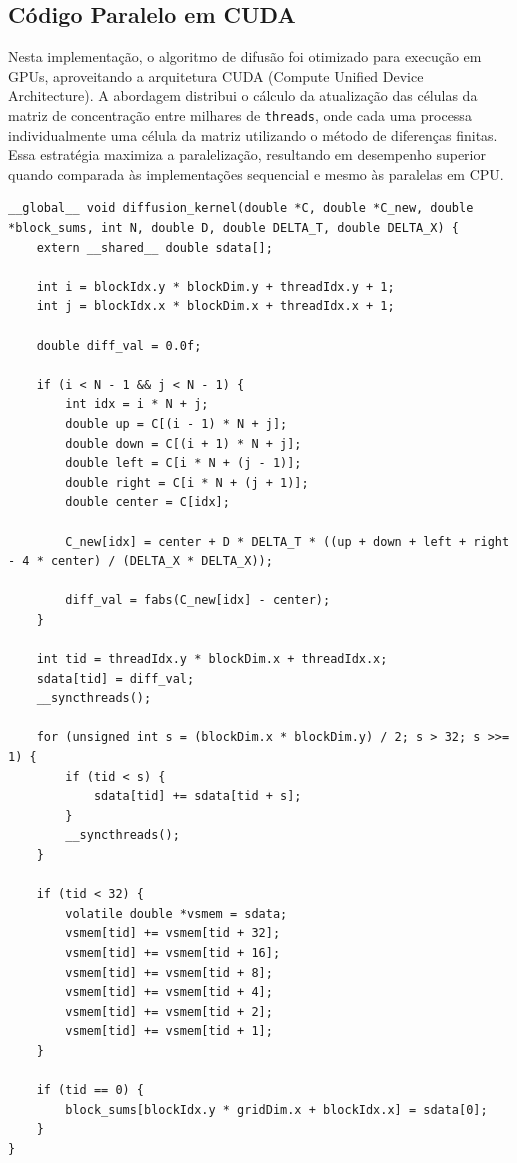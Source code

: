 \documentclass[12pt]{article}
\begin{document}
\subsection{Código Paralelo em CUDA}

Nesta implementação, o algoritmo de difusão foi otimizado para execução em
GPUs, aproveitando a arquitetura CUDA (Compute Unified Device Architecture). A
abordagem distribui o cálculo da atualização das células da matriz de
concentração entre milhares de \texttt{threads}, onde cada uma processa
individualmente uma célula da matriz utilizando o método de diferenças finitas.
Essa estratégia maximiza a paralelização, resultando em desempenho superior
quando comparada às implementações sequencial e mesmo às paralelas em CPU.

\begin{lstlisting}[style=CUDAStyle, caption={Implementação paralelizada utilizando CUDA.}, label={cod:cuda}]
__global__ void diffusion_kernel(double *C, double *C_new, double *block_sums, int N, double D, double DELTA_T, double DELTA_X) {
    extern __shared__ double sdata[]; 

    int i = blockIdx.y * blockDim.y + threadIdx.y + 1;
    int j = blockIdx.x * blockDim.x + threadIdx.x + 1;

    double diff_val = 0.0f;

    if (i < N - 1 && j < N - 1) {
        int idx = i * N + j;
        double up = C[(i - 1) * N + j];
        double down = C[(i + 1) * N + j];
        double left = C[i * N + (j - 1)];
        double right = C[i * N + (j + 1)];
        double center = C[idx];

        C_new[idx] = center + D * DELTA_T * ((up + down + left + right - 4 * center) / (DELTA_X * DELTA_X));

        diff_val = fabs(C_new[idx] - center);
    }

    int tid = threadIdx.y * blockDim.x + threadIdx.x;
    sdata[tid] = diff_val;
    __syncthreads();

    for (unsigned int s = (blockDim.x * blockDim.y) / 2; s > 32; s >>= 1) {
        if (tid < s) {
            sdata[tid] += sdata[tid + s];
        }
        __syncthreads();
    }

    if (tid < 32) {
        volatile double *vsmem = sdata;
        vsmem[tid] += vsmem[tid + 32];
        vsmem[tid] += vsmem[tid + 16];
        vsmem[tid] += vsmem[tid + 8];
        vsmem[tid] += vsmem[tid + 4];
        vsmem[tid] += vsmem[tid + 2];
        vsmem[tid] += vsmem[tid + 1];
    }

    if (tid == 0) {
        block_sums[blockIdx.y * gridDim.x + blockIdx.x] = sdata[0];
    }
}
\end{lstlisting}
\end{document}
